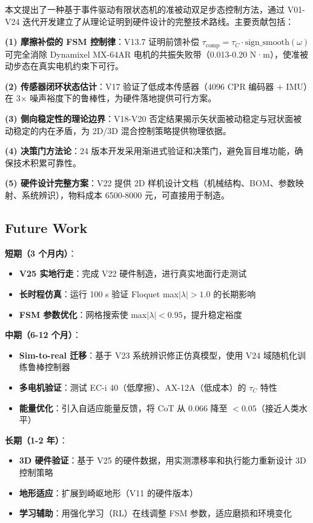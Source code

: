 
本文提出了一种基于事件驱动有限状态机的准被动双足步态控制方法，通过 V01-V24 迭代开发建立了从理论证明到硬件设计的完整技术路线。主要贡献包括：

\textbf{(1) 摩擦补偿的 FSM 控制律}：V13.7 证明前馈补偿 $\tau_{\text{comp}} = \tau_C \cdot \text{sign\_smooth}(\omega)$ 可完全消除 Dynamixel MX-64AR 电机的共振失败带（0.013-0.20 N·m），使准被动步态在真实电机约束下可行。

\textbf{(2) 传感器闭环状态估计}：V17 验证了低成本传感器（4096 CPR 编码器 + IMU）在 3× 噪声裕度下的鲁棒性，为硬件落地提供可行方案。

\textbf{(3) 侧向稳定性的理论边界}：V18-V20 否定结果揭示矢状面被动稳定与冠状面被动稳定的内在矛盾，为 2D/3D 混合控制策略提供物理依据。

\textbf{(4) 决策门方法论}：24 版本开发采用渐进式验证和决策门，避免盲目堆功能，确保技术积累可靠性。

\textbf{(5) 硬件设计完整方案}：V22 提供 2D 样机设计文档（机械结构、BOM、参数映射、系统辨识），物料成本 6500-8000 元，可直接用于制造。

\subsection{Future Work}

\textbf{短期（3 个月内）}：
\begin{itemize}
    \item \textbf{V25 实地行走}：完成 V22 硬件制造，进行真实地面行走测试
    \item \textbf{长时程仿真}：运行 100 s 验证 Floquet max$|\lambda| > 1.0$ 的长期影响
    \item \textbf{FSM 参数优化}：网格搜索使 max$|\lambda| < 0.95$，提升稳定裕度
\end{itemize}

\textbf{中期（6-12 个月）}：
\begin{itemize}
    \item \textbf{Sim-to-real 迁移}：基于 V23 系统辨识修正仿真模型，使用 V24 域随机化训练鲁棒控制器
    \item \textbf{多电机验证}：测试 EC-i 40（低摩擦）、AX-12A（低成本）的 $\tau_C$ 特性
    \item \textbf{能量优化}：引入自适应能量反馈，将 CoT 从 0.066 降至 $<0.05$（接近人类水平）
\end{itemize}

\textbf{长期（1-2 年）}：
\begin{itemize}
    \item \textbf{3D 硬件验证}：基于 V25 的硬件数据，用实测漂移率和执行能力重新设计 3D 控制策略
    \item \textbf{地形适应}：扩展到崎岖地形（V11 的硬件版本）
    \item \textbf{学习辅助}：用强化学习（RL）在线调整 FSM 参数，适应磨损和环境变化
\end{itemize}

